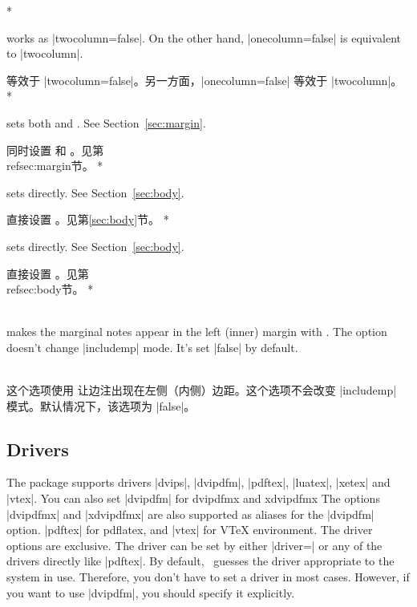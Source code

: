 \begin{Options}
\begin{paracol}{2}
\switchcolumn[0]*\item[onecolumn] works as |twocolumn=false|. On the other hand,
  |onecolumn=false| is equivalent to |twocolumn|. 
\switchcolumn\item[onecolumn] 等效于 |twocolumn=false|。另一方面，|onecolumn=false| 等效于 |twocolumn|。
\switchcolumn[0]*\item[twoside] sets both  and .
  See Section~\ref{sec:margin}.
\switchcolumn\item[twoside] 同时设置  和 。见第~\\ref{sec:margin}节。
\switchcolumn[0]*\item[textwidth] sets  directly. See Section~\ref{sec:body}.
\switchcolumn\item[textwidth] 直接设置 。见第\ref{sec:body}节。
\switchcolumn[0]*\item[textheight] sets  directly. See Section~\ref{sec:body}.
\switchcolumn\item[textheight] 直接设置 。见第~\\ref{sec:body}节。
\switchcolumn[0]*\item[reversemp\OR reversemarginpar]~\\
  makes the marginal notes appear in the left (inner) margin with
  . The option doesn't change |includemp| mode.
  It's set |false| by default.
  \switchcolumn\item[reversemp\OR reversemarginpar]~\\ 这个选项使用  让边注出现在左侧（内侧）边距。这个选项不会改变 |includemp| 模式。默认情况下，该选项为 |false|。
\end{paracol}
\end{Options}



\subsection{Drivers}\label{sec:drivers}

The package supports drivers |dvips|, |dvipdfm|, |pdftex|, |luatex|,
|xetex| and |vtex|. You can also set |dvipdfm| for \textsf{dvipdfmx} and
\textsf{xdvipdfmx} The options |dvipdfmx| and |xdvipdfmx| are also supported
as aliases for the |dvipdfm| option.
|pdftex| for \textsf{pdflatex}, and |vtex| for
V\TeX{} environment.
The driver options are exclusive. The driver can be set by either
|driver=| or any of the drivers directly like |pdftex|.
By default, \Gm\ guesses the driver appropriate to the system
in use. Therefore, you don't have to set a driver in most cases.
However, if you want to use |dvipdfm|, you should specify it explicitly.


